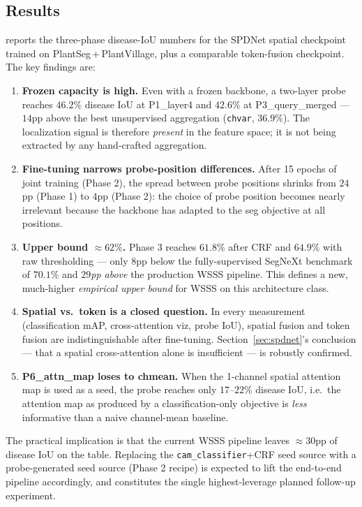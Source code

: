 \documentclass[11pt,a4paper]{article}
\begin{document}
\subsection{Results}

 reports the three-phase disease-IoU numbers for the
SPDNet spatial checkpoint trained on PlantSeg\,+\,PlantVillage, plus a
comparable token-fusion checkpoint. The key findings are:

\begin{enumerate}[label=(\alph*),leftmargin=*,itemsep=2pt]
\item \textbf{Frozen capacity is high.} Even with a frozen backbone, a
two-layer probe reaches $46.2\%$ disease IoU at P1\_layer4 and $42.6\%$
at P3\_query\_merged — $14$pp above the best unsupervised aggregation
(\texttt{chvar}, $36.9\%$). The localization signal is therefore
\emph{present} in the feature space; it is not being extracted by any
hand-crafted aggregation.
\item \textbf{Fine-tuning narrows probe-position differences.} After
15 epochs of joint training (Phase 2), the spread between probe
positions shrinks from $24$pp (Phase 1) to $4$pp (Phase 2): the
choice of probe position becomes nearly irrelevant because the
backbone has adapted to the seg objective at all positions.
\item \textbf{Upper bound $\approx62\%$.} Phase 3 reaches
$61.8\%$ after CRF and $64.9\%$ with raw thresholding — only
$8$pp below the fully-supervised SegNeXt benchmark of $70.1\%$ and
\emph{$29$pp above} the production WSSS pipeline. This defines a
new, much-higher \emph{empirical upper bound} for WSSS on this
architecture class.
\item \textbf{Spatial vs.\ token is a closed question.} In every
measurement (classification mAP, cross-attention viz, probe IoU),
spatial fusion and token fusion are indistinguishable after
fine-tuning. Section~\ref{sec:spdnet}'s conclusion — that a spatial
cross-attention alone is insufficient — is robustly confirmed.
\item \textbf{P6\_attn\_map loses to chmean.} When the
1-channel spatial attention map is used as a seed, the probe reaches
only $17$--$22\%$ disease IoU, i.e.\ the attention map as produced by a
classification-only objective is \emph{less} informative than a naive
channel-mean baseline.
\end{enumerate}

The practical implication is that the current WSSS pipeline leaves
${\approx}30$pp of disease IoU on the table. Replacing the
\texttt{cam\_classifier}+CRF seed source with a probe-generated seed
source (Phase 2 recipe) is expected to lift the end-to-end pipeline
accordingly, and constitutes the single highest-leverage planned
follow-up experiment.
\end{document}
